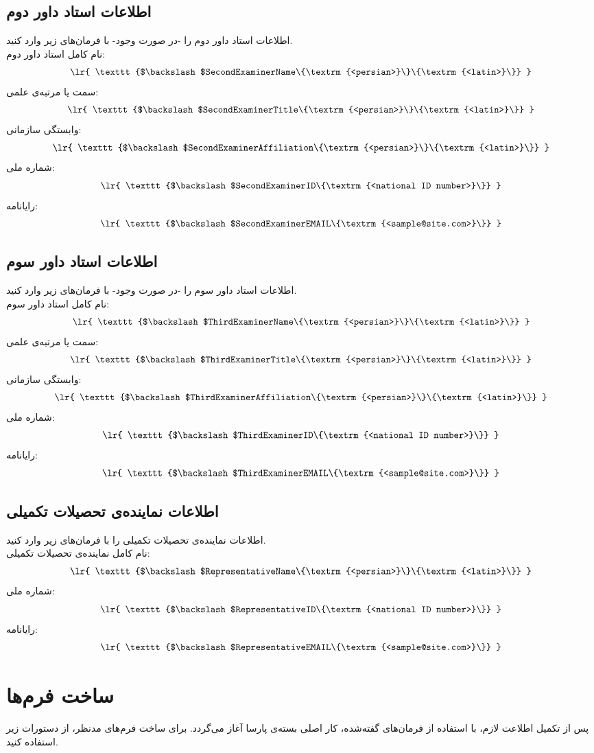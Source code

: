 \documentclass[12pt,a4paper,twoside,fleqn,notitlepage,openany]{extarticle}
\begin{document}
\subsection{اطلاعات استاد داور دوم}
اطلاعات استاد داور دوم را -در صورت وجود- با فرمان‌های زیر وارد کنید\@. \\
نام کامل استاد داور دوم:
\[ \textrm{ \lr{ \texttt{$\backslash$SecondExaminerName\{\textrm{<persian>}\}\{\textrm{<latin>}\}} } } \]
سمت یا مرتبه‌ی علمی:
\[ \textrm{ \lr{ \texttt{$\backslash$SecondExaminerTitle\{\textrm{<persian>}\}\{\textrm{<latin>}\}} } } \]
وابستگی سازمانی:
\[ \textrm{ \lr{ \texttt{$\backslash$SecondExaminerAffiliation\{\textrm{<persian>}\}\{\textrm{<latin>}\}} } } \]
شماره ملی:
\[ \textrm{ \lr{ \texttt{$\backslash$SecondExaminerID\{\textrm{<national ID number>}\}} } } \]
رایانامه:
\[ \textrm{ \lr{ \texttt{$\backslash$SecondExaminerEMAIL\{\textrm{<sample@site.com>}\}} } } \]
\subsection{اطلاعات استاد داور سوم}
اطلاعات استاد داور سوم را -در صورت وجود- با فرمان‌های زیر وارد کنید\@. \\
نام کامل استاد داور سوم:
\[ \textrm{ \lr{ \texttt{$\backslash$ThirdExaminerName\{\textrm{<persian>}\}\{\textrm{<latin>}\}} } } \]
سمت یا مرتبه‌ی علمی:
\[ \textrm{ \lr{ \texttt{$\backslash$ThirdExaminerTitle\{\textrm{<persian>}\}\{\textrm{<latin>}\}} } } \]
وابستگی سازمانی:
\[ \textrm{ \lr{ \texttt{$\backslash$ThirdExaminerAffiliation\{\textrm{<persian>}\}\{\textrm{<latin>}\}} } } \]
شماره ملی:
\[ \textrm{ \lr{ \texttt{$\backslash$ThirdExaminerID\{\textrm{<national ID number>}\}} } } \]
رایانامه:
\[ \textrm{ \lr{ \texttt{$\backslash$ThirdExaminerEMAIL\{\textrm{<sample@site.com>}\}} } } \]
\subsection{اطلاعات نماینده‌ی تحصیلات تکمیلی}
اطلاعات نماینده‌ی تحصیلات تکمیلی را با فرمان‌های زیر وارد کنید\@. \\
نام کامل نماینده‌ی تحصیلات تکمیلی:
\[ \textrm{ \lr{ \texttt{$\backslash$RepresentativeName\{\textrm{<persian>}\}\{\textrm{<latin>}\}} } } \]
شماره ملی:
\[ \textrm{ \lr{ \texttt{$\backslash$RepresentativeID\{\textrm{<national ID number>}\}} } } \]
رایانامه:
\[ \textrm{ \lr{ \texttt{$\backslash$RepresentativeEMAIL\{\textrm{<sample@site.com>}\}} } } \]
\section{ساخت فرم‌ها}
پس از تکمیل اطلاعت لازم، با استفاده از فرمان‌های گفته‌شده، کار اصلی بسته‌ی پارسا آغاز می‌گردد\@. برای ساخت فرم‌های مدنظر، از دستورات زیر استفاده کنید.\\
\end{document}
